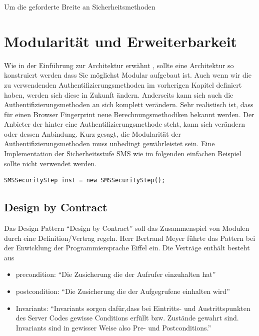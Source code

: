 Um die geforderte Breite an Sicherheitsmethoden

\newpage

\section{Modularität und
Erweiterbarkeit}\label{modularituxe4t-und-erweiterbarkeit}

Wie in der Einführung zur Architektur erwähnt , sollte eine Architektur
so konstruiert werden dass Sie möglichst Modular aufgebaut ist. Auch
wenn wir die zu verwendenden Authentifizierungsmethoden im vorherigen
Kapitel definiert haben, werden sich diese in Zukunft ändern. Anderseits
kann sich auch die Authentifizierungsmethoden an sich komplett
verändern. Sehr realistisch ist, dass für einen Browser Fingerprint neue
Berechnungsmethodiken bekannt werden. Der Anbieter der hinter eine
Authentifizierungsmethode steht, kann sich verändern oder dessen
Anbindung. Kurz gesagt, die Modularität der Authentifizierungsmethoden
muss unbedingt gewährleistet sein. Eine Implementation der
Sicherheitsstufe SMS wie im folgenden einfachen Beispiel sollte nicht
verwendet werden.

\begin{verbatim}
SMSSecurityStep inst = new SMSSecurityStep();
\end{verbatim}

\subsection{Design by Contract}\label{design-by-contract}

Das Design Pattern ``Design by Contract'' soll das Zusammenspiel von
Modulen durch eine Definition/Vertrag regeln. Herr Bertrand Meyer führte
das Pattern bei der Enwicklung der Programmiersprache Eiffel ein. Die
Verträge enthält besteht aus

\begin{itemize}
\tightlist
\item
  precondition: ``Die Zusicherung die der Aufrufer einzuhalten hat''
\item
  postcondition: ``Die Zusicherung die der Aufgegrufene einhalten wird''
\item
  Invariants: ``Invariants sorgen dafür,dass bei Eintritts- und
  Austrittspunkten des Server Codes gewisse Conditions erfüllt bzw.
  Zustände gewahrt sind. Invariants sind in gewisser Weise also Pre- und
  Postconditions.''
\end{itemize}

